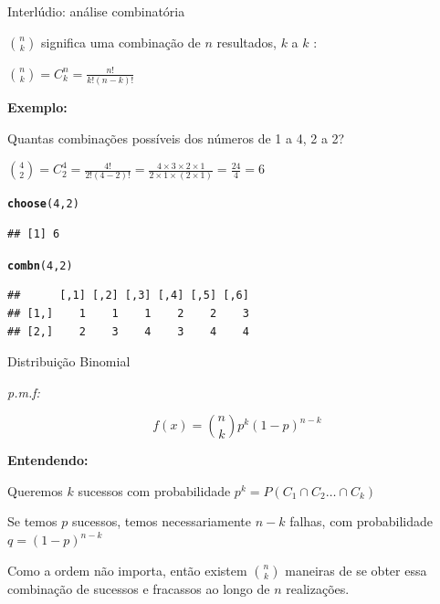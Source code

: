 \documentclass{beamer}\usepackage[]{graphicx}\usepackage[]{color}
\makeatletter
\newcommand{\hlnum}[1]{\textcolor[rgb]{0.686,0.059,0.569}{#1}}%
\newcommand{\hlstd}[1]{\textcolor[rgb]{0.345,0.345,0.345}{#1}}%
\newcommand{\hlkwd}[1]{\textcolor[rgb]{0.737,0.353,0.396}{\textbf{#1}}}%
\newenvironment{kframe}{%
 \def\at@end@of@kframe{}%
 \ifinner\ifhmode%
  \def\at@end@of@kframe{\end{minipage}}%
  \begin{minipage}{\columnwidth}%
 \fi\fi%
 \def\FrameCommand##1{\hskip\@totalleftmargin \hskip-\fboxsep
 \colorbox{shadecolor}{##1}\hskip-\fboxsep
     \hskip-\linewidth \hskip-\@totalleftmargin \hskip\columnwidth}%
 \MakeFramed {\advance\hsize-\width
   \@totalleftmargin\z@ \linewidth\hsize
   \@setminipage}}%
 {\par\unskip\endMakeFramed%
 \at@end@of@kframe}
\newenvironment{knitrout}{}{} %
\renewenvironment{knitrout}{\setlength{\topsep}{0mm}}{}
\makeatother
\begin{document}
\begin{frame}[fragile]{Interlúdio: análise combinatória}


$\binom{n}{k}$ significa uma combinação de $n$ resultados, $k$ a $k$ :

$\binom{n}{k} =  C_{k}^{n} = \frac{n!}{k!(n-k)!}$

\vfill

\alert{\textbf{Exemplo:}}

Quantas combinações possíveis dos números de 1 a 4, 2 a 2?

$\binom{4}{2} =  C_{2}^{ 4} = \frac{4!}{2!(4-2)!} = \frac{ 4 \times 3 \times 2 \times 1}{2 \times 1 \times (2 \times 1)} = \frac{24}{4} = 6$

\vfill

\begin{knitrout}\tiny
{}\color{fgcolor}\begin{kframe}
\begin{alltt}
\hlkwd{choose}\hlstd{(}\hlnum{4}\hlstd{,}\hlnum{2}\hlstd{)}
\end{alltt}
\begin{verbatim}
## [1] 6
\end{verbatim}
\begin{alltt}
\hlkwd{combn}\hlstd{(}\hlnum{4}\hlstd{,}\hlnum{2}\hlstd{)}
\end{alltt}
\begin{verbatim}
##      [,1] [,2] [,3] [,4] [,5] [,6]
## [1,]    1    1    1    2    2    3
## [2,]    2    3    4    3    4    4
\end{verbatim}
\end{kframe}
\end{knitrout}


\end{frame} 


\begin{frame}{Distribuição Binomial}

\emph{p.m.f:}

  \begin{equation*}
    f(x) = \binom{n}{k} p^k(1-p)^{n-k}
  \end{equation*}

\vfill

\textbf{Entendendo:} 

Queremos $k$ sucessos com probabilidade $p^k = P(C_1 \cap C_2 \ldots \cap C_k)$

Se temos $p$ sucessos, temos necessariamente $n-k$ falhas, com probabilidade $q = (1-p)^{n-k}$

Como a ordem não importa, então existem $\binom{n}{k}$ maneiras de se obter essa combinação de sucessos e fracassos ao longo de $n$ realizações.

\end{frame} 
\end{document}
